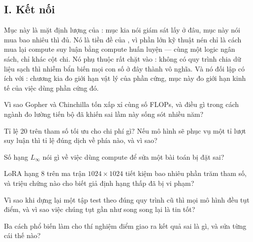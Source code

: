 \documentclass[../../../deep_learning.tex]{subfiles}
\begin{document}
\subsection{I. Kết nối}
Mục này là mặt định lượng của : mục kia nói giám sát lấy ở đâu, mục này nói mua bao nhiêu thì đủ. Nó là tiền đề của , vì phần lớn kỹ thuật nén chỉ là cách mua lại compute suy luận bằng compute huấn luyện --- cùng một logic ngân sách, chỉ khác cột chi. Nó phụ thuộc rất chặt vào : không có quy trình chia dữ liệu sạch thì nhiễm bẩn biến mọi con số ở đây thành vô nghĩa. Và nó đối lập có ích với : chương kia đo giới hạn vật lý của phần cứng, mục này đo giới hạn kinh tế của việc dùng phần cứng đó.

\begin{tukiem}
\item Vì sao Gopher và Chinchilla tốn xấp xỉ cùng số FLOPs, và điều gì trong cách ngành đo lường tiến bộ đã khiến sai lầm này sống sót nhiều năm?
\item Tỉ lệ 20  trên tham số tối ưu cho chi phí gì? Nếu mô hình sẽ phục vụ một tỉ lượt suy luận thì tỉ lệ đúng dịch về phía nào, và vì sao?
\item Số hạng $L_\infty$ nói gì về việc dùng compute để sửa một bài toán bị đặt sai?
\item LoRA hạng 8 trên ma trận $1024\times1024$ tiết kiệm bao nhiêu phần trăm tham số, và triệu chứng nào cho biết giả định hạng thấp đã bị vi phạm?
\item Vì sao khi dựng lại một tập test theo đúng quy trình cũ thì mọi mô hình đều tụt điểm, và vì sao việc chúng tụt gần như song song lại là tin tốt?
\item Ba cách phổ biến làm cho thí nghiệm điểm giao ra kết quả sai là gì, và sửa từng cái thế nào?
\end{tukiem}
\ifSubfilesClassLoaded{\printbibliography[title={Nguồn}]}{}
\end{document}
